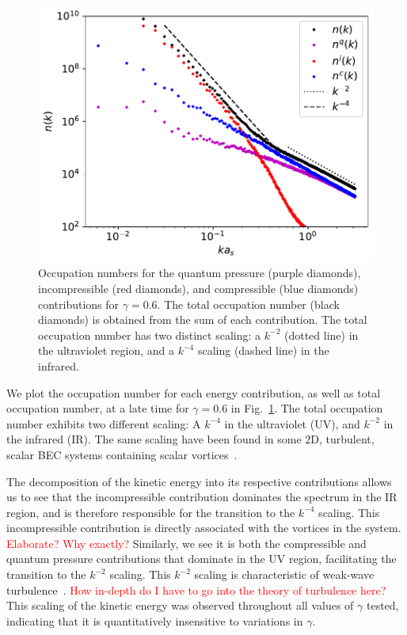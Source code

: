 \begin{figure}[t!]
    \centering
    \includegraphics[scale=0.75]{gfx/ch-twoCompDynamics/spectra.pdf}
    \caption{Occupation numbers for the quantum pressure (purple diamonds),
    incompressible (red diamonds), and compressible (blue diamonds)
    contributions for \(\gamma=0.6\).
    The total occupation number (black diamonds) is obtained from the sum of
    each contribution.
    The total occupation number has two distinct scaling: a \(k^{-2}\) 
    (dotted line) in the ultraviolet region, and a \(k^{-4}\) scaling
    (dashed line) in the infrared.\label{fig:kinetic-energy-spectra}}
\end{figure}
We plot the occupation number for each energy contribution, as well as total
occupation number, at a late time for \(\gamma=0.6\) in
Fig.~\ref{fig:kinetic-energy-spectra}.
The total occupation number exhibits two different scaling: A \(k^{-4}\) in the
ultraviolet (UV), and \(k^{-2}\) in the infrared (IR). 
The same scaling have been found in some 2D, turbulent, scalar BEC systems
containing scalar vortices~\cite{Nowak2012}.

The decomposition of the kinetic energy into its respective contributions
allows us to see that the incompressible contribution dominates the spectrum
in the IR region, and is therefore responsible for the transition to the
\(k^{-4}\) scaling.
This incompressible contribution is directly associated with the vortices in
the system. \textcolor{red}{Elaborate? Why exactly?}
Similarly, we see it is both the compressible and quantum pressure contributions
that dominate in the UV region, facilitating the transition to the \(k^{-2}\)
scaling.
This \(k^{-2}\) scaling is characteristic of weak-wave
turbulence~\cite{Zakharov1992}.
\textcolor{red}{How in-depth do I have to go into the theory of turbulence
here?}
This scaling of the kinetic energy was observed throughout all values of
\(\gamma \) tested, indicating that it is quantitatively insensitive to
variations in \(\gamma \).

